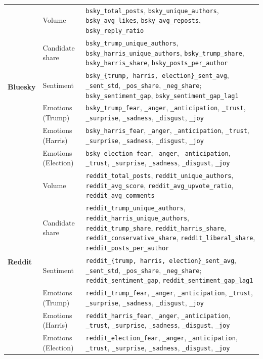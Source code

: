 \begin{longtable}{@{} p{2.3cm} p{3.6cm} p{8.7cm} @{}}
\multirow{6}{*}{\textbf{Bluesky}}
  & Volume
  & \texttt{bsky\_total\_posts}, \texttt{bsky\_unique\_authors},
    \texttt{bsky\_avg\_likes}, \texttt{bsky\_avg\_reposts}, \texttt{bsky\_reply\_ratio} \\
  & Candidate share
  & \texttt{bsky\_trump\_unique\_authors}, \texttt{bsky\_harris\_unique\_authors},
    \texttt{bsky\_trump\_share}, \texttt{bsky\_harris\_share}, \texttt{bsky\_posts\_per\_author} \\
  & Sentiment
  & \texttt{bsky\_\{trump, harris, election\}\_sent\_avg}, \texttt{\_sent\_std},
    \texttt{\_pos\_share}, \texttt{\_neg\_share};
    \texttt{bsky\_sentiment\_gap}, \texttt{bsky\_sentiment\_gap\_lag1} \\
  & Emotions (Trump)
  & \texttt{bsky\_trump\_fear}, \texttt{\_anger}, \texttt{\_anticipation},
    \texttt{\_trust}, \texttt{\_surprise}, \texttt{\_sadness},
    \texttt{\_disgust}, \texttt{\_joy} \\
  & Emotions (Harris)
  & \texttt{bsky\_harris\_fear}, \texttt{\_anger}, \texttt{\_anticipation},
    \texttt{\_trust}, \texttt{\_surprise}, \texttt{\_sadness},
    \texttt{\_disgust}, \texttt{\_joy} \\
  & Emotions (Election)
  & \texttt{bsky\_election\_fear}, \texttt{\_anger}, \texttt{\_anticipation},
    \texttt{\_trust}, \texttt{\_surprise}, \texttt{\_sadness},
    \texttt{\_disgust}, \texttt{\_joy} \\
\midrule

\multirow{6}{*}{\textbf{Reddit}}
  & Volume
  & \texttt{reddit\_total\_posts}, \texttt{reddit\_unique\_authors},
    \texttt{reddit\_avg\_score}, \texttt{reddit\_avg\_upvote\_ratio},
    \texttt{reddit\_avg\_comments} \\
  & Candidate share
  & \texttt{reddit\_trump\_unique\_authors}, \texttt{reddit\_harris\_unique\_authors},
    \texttt{reddit\_trump\_share}, \texttt{reddit\_harris\_share},
    \texttt{reddit\_conservative\_share}, \texttt{reddit\_liberal\_share},
    \texttt{reddit\_posts\_per\_author} \\
  & Sentiment
  & \texttt{reddit\_\{trump, harris, election\}\_sent\_avg}, \texttt{\_sent\_std},
    \texttt{\_pos\_share}, \texttt{\_neg\_share};
    \texttt{reddit\_sentiment\_gap}, \texttt{reddit\_sentiment\_gap\_lag1} \\
  & Emotions (Trump)
  & \texttt{reddit\_trump\_fear}, \texttt{\_anger}, \texttt{\_anticipation},
    \texttt{\_trust}, \texttt{\_surprise}, \texttt{\_sadness},
    \texttt{\_disgust}, \texttt{\_joy} \\
  & Emotions (Harris)
  & \texttt{reddit\_harris\_fear}, \texttt{\_anger}, \texttt{\_anticipation},
    \texttt{\_trust}, \texttt{\_surprise}, \texttt{\_sadness},
    \texttt{\_disgust}, \texttt{\_joy} \\
  & Emotions (Election)
  & \texttt{reddit\_election\_fear}, \texttt{\_anger}, \texttt{\_anticipation},
    \texttt{\_trust}, \texttt{\_surprise}, \texttt{\_sadness},
    \texttt{\_disgust}, \texttt{\_joy} \\
\midrule


\end{longtable}
